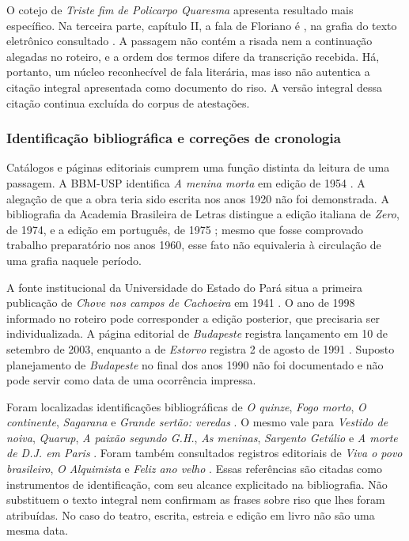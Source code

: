 O cotejo de \textit{Triste fim de Policarpo Quaresma} apresenta resultado mais específico. Na terceira parte, capítulo II, a fala de Floriano é , na grafia do texto eletrônico consultado \cite{r2policarpo}. A passagem não contém a risada nem a continuação alegadas no roteiro, e a ordem dos termos difere da transcrição recebida. Há, portanto, um núcleo reconhecível de fala literária, mas isso não autentica a citação integral apresentada como documento do riso. A versão integral dessa citação continua excluída do corpus de atestações.

\subsubsection{Identificação bibliográfica e correções de cronologia}
Catálogos e páginas editoriais cumprem uma função distinta da leitura de uma passagem. A BBM-USP identifica \textit{A menina morta} em edição de 1954 \cite{r2meninamorta}. A alegação de que a obra teria sido escrita nos anos 1920 não foi demonstrada. A bibliografia da Academia Brasileira de Letras distingue a edição italiana de \textit{Zero}, de 1974, e a edição em português, de 1975 \cite{r2zero}; mesmo que fosse comprovado trabalho preparatório nos anos 1960, esse fato não equivaleria à circulação de uma grafia naquele período.

A fonte institucional da Universidade do Estado do Pará situa a primeira publicação de \textit{Chove nos campos de Cachoeira} em 1941 \cite{r2chove}. O ano de 1998 informado no roteiro pode corresponder a edição posterior, que precisaria ser individualizada. A página editorial de \textit{Budapeste} registra lançamento em 10 de setembro de 2003, enquanto a de \textit{Estorvo} registra 2 de agosto de 1991 \cite{r2budapeste,r2estorvo}. Suposto planejamento de \textit{Budapeste} no final dos anos 1990 não foi documentado e não pode servir como data de uma ocorrência impressa.

Foram localizadas identificações bibliográficas de \textit{O quinze}, \textit{Fogo morto}, \textit{O continente}, \textit{Sagarana} e \textit{Grande sertão: veredas} \cite{r2quinze,r2fogo,r2continente,r2sagarana,r2grande}. O mesmo vale para \textit{Vestido de noiva}, \textit{Quarup}, \textit{A paixão segundo G.H.}, \textit{As meninas}, \textit{Sargento Getúlio} e \textit{A morte de D.J. em Paris} \cite{r2vestido,r2quarup,r2paixao,r2meninas,r2getulio,r2morte}. Foram também consultados registros editoriais de \textit{Viva o povo brasileiro}, \textit{O Alquimista} e \textit{Feliz ano velho} \cite{r2viva,r2alquimista,r2feliz}. Essas referências são citadas como instrumentos de identificação, com seu alcance explicitado na bibliografia. Não substituem o texto integral nem confirmam as frases sobre riso que lhes foram atribuídas. No caso do teatro, escrita, estreia e edição em livro não são uma mesma data.

